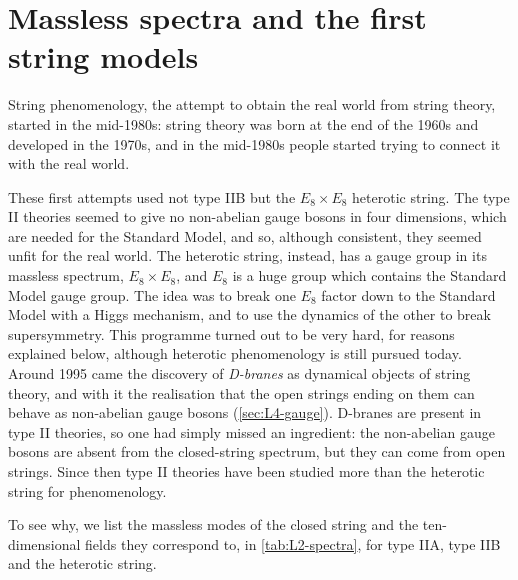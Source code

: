 \section{Massless spectra and the first string models}
\label{sec:L2-spectra}

String phenomenology, the attempt to obtain the real world from string theory, started in the mid-1980s: string theory was born at the end of the 1960s and developed in the 1970s, and in the mid-1980s people started trying to connect it with the real world.

These first attempts used not type IIB but the $E_8\times E_8$ heterotic string. The type II theories seemed to give no non-abelian gauge bosons in four dimensions, which are needed for the Standard Model, and so, although consistent, they seemed unfit for the real world. The heterotic string, instead, has a gauge group in its massless spectrum, $E_8\times E_8$, and $E_8$ is a huge group which contains the Standard Model gauge group. The idea was to break one $E_8$ factor down to the Standard Model with a Higgs mechanism, and to use the dynamics of the other to break supersymmetry. This programme turned out to be very hard, for reasons explained below, although heterotic phenomenology is still pursued today. Around 1995 came the discovery of \emph{D-branes} as dynamical objects of string theory, and with it the realisation that the open strings ending on them can behave as non-abelian gauge bosons (\cref{sec:L4-gauge}). D-branes are present in type II theories, so one had simply missed an ingredient: the non-abelian gauge bosons are absent from the closed-string spectrum, but they can come from open strings. Since then type II theories have been studied more than the heterotic string for phenomenology.

To see why, we list the massless modes of the closed string and the ten-dimensional fields they correspond to, in \cref{tab:L2-spectra}, for type IIA, type IIB and the heterotic string.

